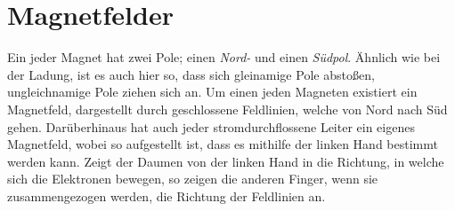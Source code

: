 \documentclass{article}
\begin{document}
\section{Magnetfelder}
Ein jeder Magnet hat zwei Pole; einen \emph{Nord-} und einen \emph{Südpol}. Ähnlich wie bei der Ladung, ist es auch hier so, dass sich gleinamige Pole abstoßen, ungleichnamige Pole ziehen sich an. \newline  
Um einen jeden Magneten existiert ein Magnetfeld, dargestellt durch geschlossene Feldlinien, welche von Nord nach Süd gehen. \newline 
Darüberhinaus hat auch jeder stromdurchflossene Leiter ein eigenes Magnetfeld, wobei so aufgestellt ist, dass es mithilfe der linken Hand bestimmt werden kann. Zeigt der Daumen von der linken Hand in die Richtung, in welche sich die Elektronen bewegen, so zeigen die anderen Finger, wenn sie zusammengezogen werden, die Richtung der Feldlinien an.
\end{document}
